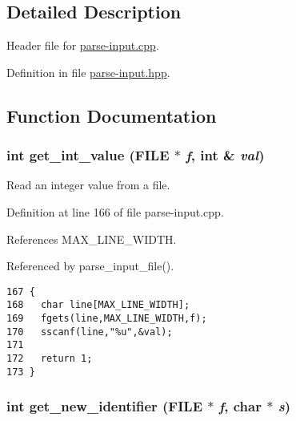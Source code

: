 \subsection{Detailed Description}
Header file for \hyperlink{parse-input_8cpp}{parse-input.cpp}. 



Definition in file \hyperlink{parse-input_8hpp-source}{parse-input.hpp}.

\subsection{Function Documentation}
\hypertarget{parse-input_8hpp_84d83813df0dc09fd6a2a4fbfc893d03}{
\subsubsection[get\_\-int\_\-value]{\setlength{\rightskip}{0pt plus 5cm}int get\_\-int\_\-value (FILE $\ast$ {\em f}, int \& {\em val})}}
\label{parse-input_8hpp_84d83813df0dc09fd6a2a4fbfc893d03}


Read an integer value from a file. 



Definition at line 166 of file parse-input.cpp.

References MAX\_\-LINE\_\-WIDTH.

Referenced by parse\_\-input\_\-file().

\begin{Code}\begin{verbatim}167 {
168   char line[MAX_LINE_WIDTH];
169   fgets(line,MAX_LINE_WIDTH,f);
170   sscanf(line,"%u",&val);
171 
172   return 1;
173 }
\end{verbatim}\end{Code}


\hypertarget{parse-input_8hpp_e28f089803e889dc1c1412f56f482ee7}{
\subsubsection[get\_\-new\_\-identifier]{\setlength{\rightskip}{0pt plus 5cm}int get\_\-new\_\-identifier (FILE $\ast$ {\em f}, char $\ast$ {\em s})}}
\label{parse-input_8hpp_e28f089803e889dc1c1412f56f482ee7}


